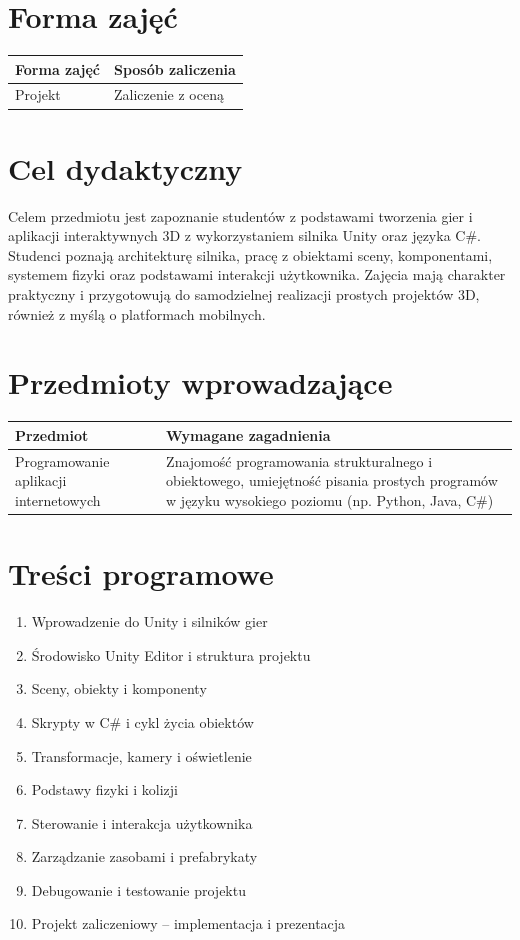 \documentclass[12pt, a4paper]{article}
\begin{document}
\section{Forma zajęć}

\begin{tabular}{ll}
  \hline
  \textbf{Forma zajęć} & \textbf{Sposób zaliczenia} \\
  \hline
  Projekt & Zaliczenie z oceną \\
  \hline
\end{tabular}

\section{Cel dydaktyczny}

Celem przedmiotu jest zapoznanie studentów z podstawami tworzenia gier i aplikacji interaktywnych 3D z wykorzystaniem silnika Unity oraz języka C\#. Studenci poznają architekturę silnika, pracę z obiektami sceny, komponentami, systemem fizyki oraz podstawami interakcji użytkownika. Zajęcia mają charakter praktyczny i przygotowują do samodzielnej realizacji prostych projektów 3D, również z myślą o platformach mobilnych.

\section{Przedmioty wprowadzające}

\begin{tabularx}{\textwidth}{lX}
  \hline
  \textbf{Przedmiot} & \textbf{Wymagane zagadnienia} \\
  \hline
  Programowanie aplikacji internetowych & Znajomość programowania strukturalnego i obiektowego, umiejętność pisania prostych programów w języku wysokiego poziomu (np. Python, Java, C\#) \\
  \hline
\end{tabularx}

\section{Treści programowe}

\begin{enumerate}
  \item Wprowadzenie do Unity i silników gier
  \item Środowisko Unity Editor i struktura projektu
  \item Sceny, obiekty i komponenty
  \item Skrypty w C\# i cykl życia obiektów
  \item Transformacje, kamery i oświetlenie
  \item Podstawy fizyki i kolizji
  \item Sterowanie i interakcja użytkownika
  \item Zarządzanie zasobami i prefabrykaty
  \item Debugowanie i testowanie projektu
  \item Projekt zaliczeniowy – implementacja i prezentacja
\end{enumerate}
\end{document}
